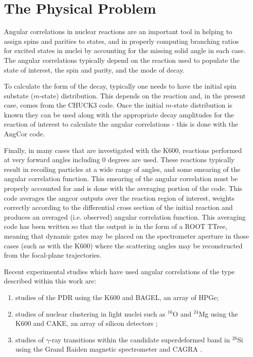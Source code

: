 \documentclass[a4paper,10pt]{article}
\begin{document}
\section{The Physical Problem}

Angular correlations in nuclear reactions are an important tool in helping to assign spins and parities to states, and in properly computing branching ratios for excited states in nuclei by accounting for the missing solid angle in each case. The angular correlations typically depend on the reaction used to populate the state of interest, the spin and parity, and the mode of decay.

To calculate the form of the decay, typically one needs to have the initial spin substate ($m$-state) distribution. This depends on the reaction and, in the present case, comes from the CHUCK3 code. Once the initial $m$-state distribution is known they can be used along with the appropriate decay amplitudes for the reaction of interest to calculate the angular correlations - this is done with the AngCor code.

Finally, in many cases that are investigated with the K600, reactions performed at very forward angles including 0 degrees are used. These reactions typically result in recoiling particles at a wide range of angles, and some smearing of the angular correlation function. This smearing of the angular correlation must be properly accounted for and is done with the averaging portion of the code. This code averages the angcor outputs over the reaction region of interest, weights correctly according to the differential cross section of the initial reaction and produces an averaged (i.e. observed) angular correlation function. This averaging code has been written so that the output is in the form of a ROOT TTree, meaning that dynamic gates may be placed on the spectrometer aperture in those cases (such as with the K600) where the scattering angles may be reconstructed from the focal-plane trajectories. 

Recent experimental studies which have used angular correlations of the type described within this work are:

\begin{enumerate}
 \item studies of the PDR using the K600 and BAGEL, an array of HPGe;
 \item studies of nuclear clustering in light nuclei such as $^{16}$O \cite{dummy} and $^{24}$Mg \cite{dummy} using the K600 and CAKE, an array of silicon detectors \cite{dummy};
 \item studies of $\gamma$-ray transitions within the candidate superdeformed band in $^{28}$Si using the Grand Raiden magnetic spectrometer and CAGRA \cite{dummy}.
\end{enumerate}
  
\end{document}
